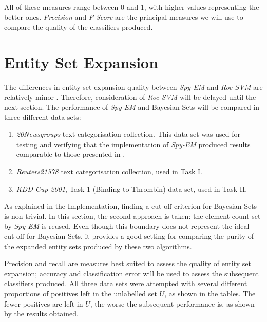 \documentclass[12pt,twoside,notitlepage,amsart]{report} %
\begin{document}
	All of these measures range between 0 and 1, with higher values representing the better ones. \emph{Precision} and \emph{F-Score} are the principal measures we will use to compare the quality of the classifiers produced.
	
	
	\section{Entity Set Expansion}
	
	The differences in entity set expansion quality between \emph{Spy-EM} and \emph{Roc-SVM} are relatively minor \cite{Li03}. Therefore, consideration of \emph{Roc-SVM} will be delayed until the next section. The performance of \emph{Spy-EM} and Bayesian Sets will be compared in three different data sets:
	\begin{enumerate}
	\item \emph{20Newsgroups} text categorisation collection. This data set was used for testing and verifying that the implementation of \emph{Spy-EM} produced results comparable to those presented in \cite{Liu02}. 
	\item \emph{Reuters21578} text categorisation collection, used in Task I.
	\item \emph{KDD Cup 2001}, Task 1 (Binding to Thrombin) data set, used in Task II.
	\end{enumerate}
	
	As explained in the Implementation, finding a cut-off criterion for Bayesian Sets is non-trivial. In this section, the second approach is taken: the element count set by \emph{Spy-EM} is reused. Even though this boundary does not represent the ideal cut-off for Bayesian Sets, it provides a good setting for comparing the purity of the expanded entity sets produced by these two algorithms. 
	
	Precision and recall are measures best suited to assess the quality of entity set expansion; accuracy and classification error will be used to assess the subsequent classifiers produced. All three data sets were attempted with several different proportions of positives left in the unlabelled set $U$, as shown in the tables. The fewer positives are left in $U$, the worse the subsequent performance is, as shown by the results obtained. 
	
\end{document}
